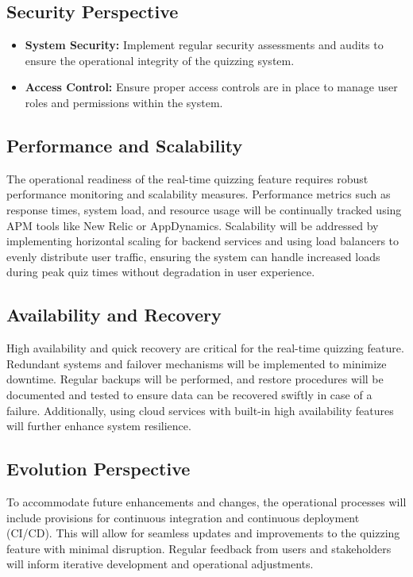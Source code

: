 \subsection{Security Perspective}

\begin{itemize}
    \item \textbf{System Security:} Implement regular security assessments and audits to ensure the operational integrity of the quizzing system.
    \item \textbf{Access Control:} Ensure proper access controls are in place to manage user roles and permissions within the system.
\end{itemize}


\subsection{Performance and Scalability}

The operational readiness of the real-time quizzing feature requires robust performance monitoring and scalability measures. Performance metrics such as response times, system load, and resource usage will be continually tracked using APM tools like New Relic or AppDynamics. Scalability will be addressed by implementing horizontal scaling for backend services and using load balancers to evenly distribute user traffic, ensuring the system can handle increased loads during peak quiz times without degradation in user experience.


\subsection{Availability and Recovery}

High availability and quick recovery are critical for the real-time quizzing feature. Redundant systems and failover mechanisms will be implemented to minimize downtime. Regular backups will be performed, and restore procedures will be documented and tested to ensure data can be recovered swiftly in case of a failure. Additionally, using cloud services with built-in high availability features will further enhance system resilience.


\subsection{Evolution Perspective}

To accommodate future enhancements and changes, the operational processes will include provisions for continuous integration and continuous deployment (CI/CD). This will allow for seamless updates and improvements to the quizzing feature with minimal disruption. Regular feedback from users and stakeholders will inform iterative development and operational adjustments.


